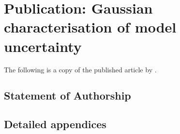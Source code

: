 
\chapter{Publication: Gaussian characterisation of model uncertainty}
The following is a copy of the published article by \citet{BlakeEtAl_2023_ExplicitGaussianCharacterisation}.

\section{Statement of Authorship}






\section{Detailed appendices}


